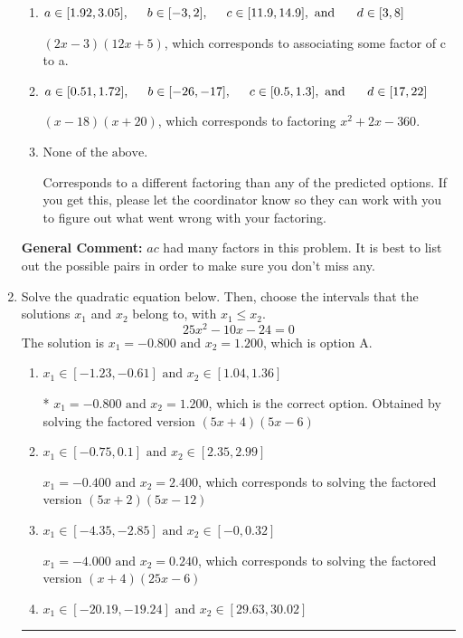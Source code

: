 \documentclass{extbook}[14pt]
\newcommand{\litem}[1]{\item #1

\rule{\textwidth}{0.4pt}}
\begin{document}
\begin{enumerate}
{\begin{enumerate}[label=\Alph*.]
* $(4x -3)(6x + 5)$, which is the correct option.
\item \( a \in [1.92, 3.05], \hspace*{5mm} b \in [-3, 2], \hspace*{5mm} c \in [11.9, 14.9], \text{ and } \hspace*{5mm} d \in [3, 8] \)

 $(2x -3)(12x + 5)$, which corresponds to associating some factor of c to a.
\item \( a \in [0.51, 1.72], \hspace*{5mm} b \in [-26, -17], \hspace*{5mm} c \in [0.5, 1.3], \text{ and } \hspace*{5mm} d \in [17, 22] \)

 $(x -18)(x + 20)$, which corresponds to factoring $x^{2} +2 x -360$.
\item \( \text{None of the above.} \)

 Corresponds to a different factoring than any of the predicted options. If you get this, please let the coordinator know so they can work with you to figure out what went wrong with your factoring.
\end{enumerate}

\textbf{General Comment:} $ac$ had many factors in this problem. It is best to list out the possible pairs in order to make sure you don't miss any.
}
\litem{
Solve the quadratic equation below. Then, choose the intervals that the solutions $x_1$ and $x_2$ belong to, with $x_1 \leq x_2$.
\[ 25x^{2} -10 x -24 = 0 \]The solution is \( x_1 = -0.800 \text{ and } x_2 = 1.200 \), which is option A.\begin{enumerate}[label=\Alph*.]
\item \( x_1 \in [-1.23, -0.61] \text{ and } x_2 \in [1.04, 1.36] \)

* $x_1 = -0.800 \text{ and } x_2 = 1.200$, which is the correct option. Obtained by solving the factored version $(5x + 4)(5x -6)$
\item \( x_1 \in [-0.75, 0.1] \text{ and } x_2 \in [2.35, 2.99] \)

$x_1 = -0.400 \text{ and } x_2 = 2.400$, which corresponds to solving the factored version $(5x + 2)(5x -12)$
\item \( x_1 \in [-4.35, -2.85] \text{ and } x_2 \in [-0, 0.32] \)

$x_1 = -4.000 \text{ and } x_2 = 0.240$, which corresponds to solving the factored version $(x + 4)(25x -6)$
\item \( x_1 \in [-20.19, -19.24] \text{ and } x_2 \in [29.63, 30.02] \)


\end{enumerate}}
\end{enumerate}
\end{document}
